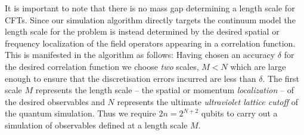 \documentclass[12pt]{article}
\newcommand{\1}{\mathds{1}}
\begin{document}
It is important to note that there is no mass gap determining a length scale for CFTs. Since our simulation algorithm directly targets the continuum model the length scale for the problem is instead determined by the desired spatial or frequency localization of the field operators appearing in a correlation function. This is manifested in the algorithm as follows: Having chosen an accuracy $\delta$ for the desired correlation function we choose \emph{two} scales, $M < N$ which are large enough to ensure that the discretisation errors incurred are less than $\delta$. The first scale $M$ represents the length scale -- the spatial or momentum \emph{localization} -- of the desired observables and $N$ represents the ultimate \emph{ultraviolet lattice cutoff} of the quantum simulation. Thus we require $2n = 2^{N+2}$ qubits to carry out a simulation of observables defined at a length scale $M$.
\end{document}

